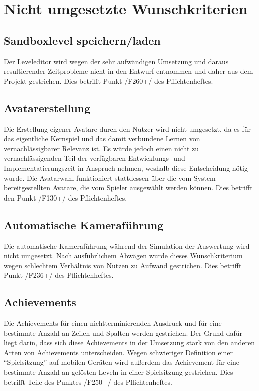 \chapter{Nicht umgesetzte Wunschkriterien}

\section{Sandboxlevel speichern/laden}
	Der Leveleditor wird wegen der sehr aufwändigen Umsetzung und daraus resultierender Zeitprobleme 
nicht in den Entwurf entnommen und daher aus dem Projekt gestrichen. Dies betrifft Punkt /F260+/ des Pflichtenheftes.  
 
\section{Avatarerstellung}
Die Erstellung eigener Avatare durch den Nutzer wird  nicht umgesetzt, da es für das eigentliche Kernspiel und das damit verbundene Lernen von vernachlässigbarer Relevanz ist. Es würde jedoch einen nicht zu vernachlässigenden Teil der verfügbaren Entwicklungs- und Implementatierungszeit in Anspruch nehmen, weshalb diese Entscheidung nötig wurde. Die Avatarwahl funktioniert stattdessen
über die vom System bereitgestellten Avatare, die vom Spieler ausgewählt werden können. Dies betrifft 
den Punkt /F130+/ des Pflichtenheftes.  

\section{Automatische Kameraführung}
Die automatische Kameraführung während der Simulation der Auswertung wird nicht umgesetzt. Nach 
ausführlichem Abwägen wurde dieses Wunschkriterium wegen schlechtem Verhältnis von Nutzen zu Aufwand 
gestrichen. Dies betrifft Punkt /F236+/ des Pflichtenheftes. 

\section{Achievements}
Die Achievements für einen nichtterminierenden Ausdruck und für eine bestimmte Anzahl an Zeilen und Spalten 
werden gestrichen. Der Grund dafür liegt darin, dass sich diese Achievements in der Umsetzung stark von den
anderen Arten von Achievements unterscheiden. Wegen schwieriger Definition einer ``Spielsitzung'' auf mobilen Geräten wird außerdem das Achievement für eine bestimmte Anzahl an gelösten Leveln in einer Spielsitzung gestrichen.
Dies betrifft Teile des Punktes /F250+/ des Pflichtenheftes.  